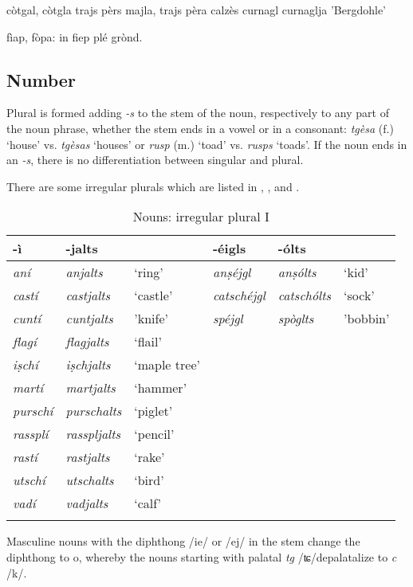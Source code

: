 còtgal, còtgla
trajs pèrs majla, trajs pèra calzès
curnagl curnaglja 'Bergdohle'

fìap, fòpa: in fiep plé grònd.



\subsection{Number}
Plural is formed adding \textit{-s} to the stem of the noun, respectively to any part of the noun phrase, whether the stem ends in a vowel or in a consonant: \textit{tgèsa} (f.) `house' vs. \textit{tgèsas} `houses' or \textit{rusp} (m.) `toad' vs. \textit{rusps} `toads'. If the noun ends in an \textit{-s}, there is no differentiation between singular and plural. %

There are some irregular plurals which are listed in ,  , and . 


\begin{table}
\caption{Nouns: irregular plural I}
\label{irregplI}
 \begin{tabular}{llllll}
  \lsptoprule
   -ì & -jalts & & -éigls & -ólts & \\
  \midrule
\textit{aní} & \textit{anjalts} & `ring' & \textit{anṣéjgl} & \textit{anṣólts} & `kid'\\
\textit{castí} & \textit{castjalts} & `castle' & \textit{catschéjgl} & \textit{catschólts} & `sock'\\
\textit{cuntí} & \textit{cuntjalts} & 'knife' & \textit{spéjgl} & \textit{spòglts} & 'bobbin'\\
\textit{flagí}  &   \textit{flagjalts} & `flail' \\
\textit{iṣchí} & \textit{iṣchjalts} & `maple tree'\\
  \textit{martí} & \textit{martjalts} &`hammer'\\
  \textit{purschí} & \textit{purschalts} & `piglet'\\
  \textit{rassplí} & \textit{rasspljalts} & `pencil'\\
  \textit{rastí} & \textit{rastjalts} & `rake'\\
\textit{utschí} & \textit{utschalts}  &`bird'\\
\textit{vadí} & \textit{vadjalts} & `calf'\\
  \lspbottomrule
 \end{tabular}
\end{table}

Masculine nouns with the diphthong /ie/ or /ej/ in the stem change the diphthong to o, whereby the nouns starting with palatal \textit{tg} /ʨ/depalatalize to \textit{c} /k/.


